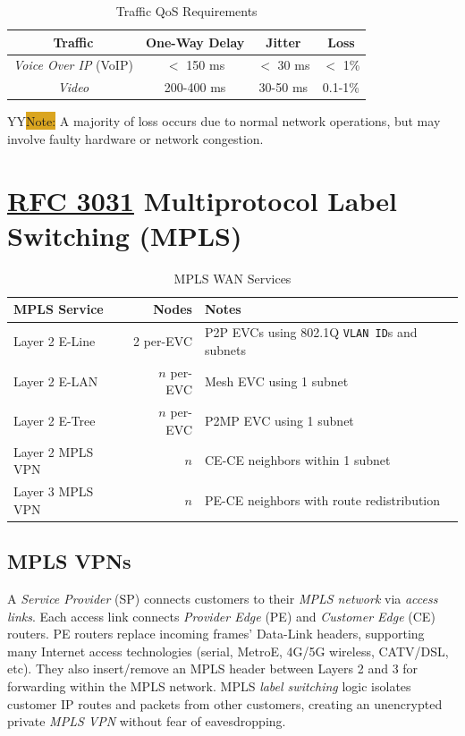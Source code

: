 \documentclass[12pt]{article}
\newcommand{\printColor}{Y}								%
\newcommand{\note}[1]{\if\printColor Y{\colorbox{#1}{Note:}}\else{\underline{Note:}}\fi}
\newcommand{\RFC}[1]{\href{https://datatracker.ietf.org/doc/html/rfc#1}{RFC #1}}
\begin{document}
	\begin{table}[H]
	\centering
	\caption{Traffic QoS Requirements \label{tab:QOS TRAFFIC}}
	\begin{tabular}{c | c c c}
	\textbf{Traffic}			&\textbf{One-Way Delay}	& \textbf{Jitter}	&\textbf{Loss}\\\hline
	\textit{Voice Over IP} (VoIP)	& $<$ 150 ms 			& $<$ 30 ms 	& $<$ 1\%\\
	\textit{Video}			& 200-400 ms 			& 30-50 ms 	& 0.1-1\%\\
	\end{tabular}
	\end{table}
	\note{Goldenrod} A majority of loss occurs due to normal network operations, but may involve faulty hardware or network congestion.





\section[RFC 3031 MPLS]{\RFC{3031} Multiprotocol Label Switching (MPLS)\label{sec:MPLS}}
	\begin{table}[H]
	\centering
	\caption{MPLS WAN Services \label{tab:MPLS SERVICES}}
	\begin{tabular}{| l | r | l |}\hline
	\textbf{MPLS Service}	& \textbf{Nodes}	& \textbf{Notes}\\\hline
	Layer 2 E-Line		& 2 per-EVC	& P2P EVCs using 802.1Q \texttt{VLAN ID}s and subnets\\\hline
	Layer 2 E-LAN		& $n$ per-EVC	& Mesh EVC using 1 subnet\\\hline
	Layer 2 E-Tree		& $n$ per-EVC	& P2MP EVC using 1 subnet\\\hline
	Layer 2 MPLS VPN	& $n$		& CE-CE neighbors within 1 subnet\\\hline
	Layer 3 MPLS VPN	& $n$		& PE-CE neighbors with route redistribution\\\hline
	\end{tabular}\end{table}%


	\subsection{MPLS VPNs \label{subsec:MPLS VPN}}
	A \textit{Service Provider} (SP) connects customers to their \textit{MPLS network} via \textit{access links}. Each access link connects \textit{Provider Edge} (PE) and \textit{Customer Edge} (CE) routers. PE routers replace incoming frames' Data-Link headers, supporting many Internet access technologies (serial, MetroE, 4G/5G wireless, CATV/DSL, etc). They also insert/remove an MPLS header between Layers 2 and 3 for forwarding within the MPLS network. MPLS \textit{label switching} logic isolates customer IP routes and packets from other customers, creating an unencrypted private \textit{MPLS VPN} without fear of eavesdropping.
\end{document}
